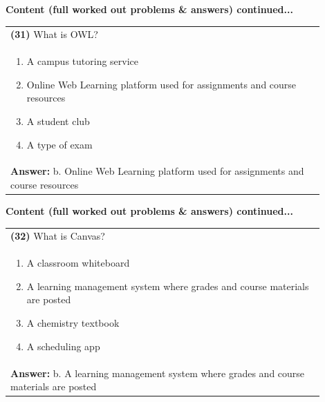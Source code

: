 \documentclass{article}
\begin{document}
{{{{{{{{{{\noindent
{\large\textbf{Content (full worked out problems \& answers) continued...}\\[0.2em]
\vspace{0.2cm}
\begin{tabular}{|p{0.9\linewidth}|}
\hline
\textbf{(31)} What is OWL?\\
\vspace{0.2cm}
\begin{minipage}[t]{0.85\linewidth}
\begin{enumerate}[label=\alph*.]
   \item A campus tutoring service
   \item Online Web Learning platform used for assignments and course resources
   \item A student club
   \item A type of exam
\end{enumerate}
\end{minipage}\\
\hline
\vspace{0.2cm}
\textbf{Answer:} b. Online Web Learning platform used for assignments and course resources\\
\hline
\end{tabular}
\newpage


\noindent
{\large\textbf{Content (full worked out problems \& answers) continued...}\\[0.2em]
\vspace{0.2cm}
\begin{tabular}{|p{0.9\linewidth}|}
\hline
\vspace{0.2cm}
\textbf{(32)} What is Canvas?\\
\begin{minipage}[t]{0.85\linewidth}
\begin{enumerate}[label=\alph*.]
   \item A classroom whiteboard
   \item A learning management system where grades and course materials are posted
   \item A chemistry textbook
   \item A scheduling app
\end{enumerate}
\end{minipage}\\
\hline
\vspace{0.2cm}
\textbf{Answer:} b. A learning management system where grades and course materials are posted\\
\hline
\end{tabular}
\newpage

}}}}}}}}}}}}
\end{document}

